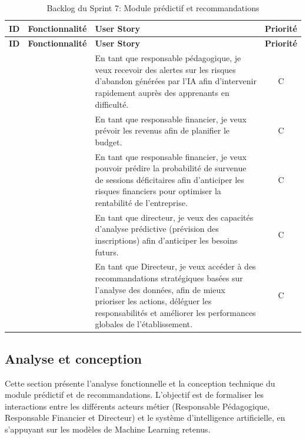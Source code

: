 \begin{longtable}{|c|p{3.5cm}|p{10cm}|c|}
\caption{Backlog du Sprint 7: Module prédictif et recommandations}
\label{tab:sprint7_backlog} \\

\hline
\textbf{ID} & \textbf{Fonctionnalité} & \textbf{User Story} & \textbf{Priorité} \\
\hline
\endfirsthead

\hline
\textbf{ID} & \textbf{Fonctionnalité} & \textbf{User Story} & \textbf{Priorité} \\
\hline
\endhead

\hline
\endfoot

\hline
\endlastfoot

 & 
& En tant que responsable pédagogique, je veux recevoir des alertes sur les risques d'abandon générées par l'IA afin d'intervenir rapidement auprès des apprenants en difficulté. & C \\
& & En tant que responsable financier, je veux prévoir les revenus afin de planifier le budget. & C \\
&& En tant que responsable financier, je veux pouvoir prédire la probabilité de survenue de sessions déficitaires afin d'anticiper les risques financiers pour optimiser la rentabilité de l'entreprise. & C\\
& & En tant que directeur, je veux des capacités d'analyse prédictive (prévision des inscriptions) afin d'anticiper les besoins futurs. & C \\
& & En tant que Directeur, je veux accéder à des recommandations stratégiques basées sur l'analyse des données, afin de mieux prioriser les actions, déléguer les responsabilités et améliorer les performances globales de l'établissement. & C \\
\hline

\end{longtable}

\subsection{Analyse et conception}

Cette section présente l'analyse fonctionnelle et la conception technique du module prédictif et de recommandations. L'objectif est de formaliser les interactions entre les différents acteurs métier (Responsable Pédagogique, Responsable Financier et Directeur) et le système d'intelligence artificielle, en s'appuyant sur les modèles de Machine Learning retenus.




